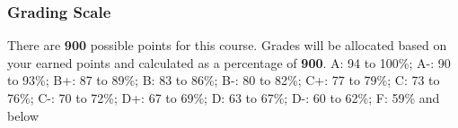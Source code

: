 \hypertarget{grading-scale}{%
\subsubsection{Grading Scale}\label{grading-scale}}

There are \textbf{900} possible points for this course. Grades will be
allocated based on your earned points and calculated as a percentage of
\textbf{900}. A: 94 to 100\%; A-: 90 to 93\%; B+: 87 to 89\%; B: 83 to
86\%; B-: 80 to 82\%; C+: 77 to 79\%; C: 73 to 76\%; C-: 70 to 72\%; D+:
67 to 69\%; D: 63 to 67\%; D-: 60 to 62\%; F: 59\% and below
